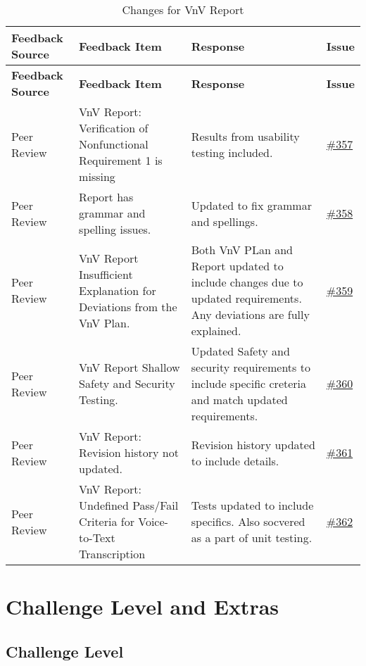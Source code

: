 \documentclass{article}
\begin{document}
\begin{longtable}{| p{} | p{} | p{} | p{} |}
    \caption{Changes for VnV Report} \\
    \hline
    \textbf{Feedback Source} & \textbf{Feedback Item} & \textbf{Response} & \textbf{Issue} \\
    \hline
    \endfirsthead
    \hline
    \textbf{Feedback Source} & \textbf{Feedback Item} & \textbf{Response} & \textbf{Issue} \\
    \hline
    \endhead
    \hline
    \endfoot
    Peer Review & VnV Report: Verification of Nonfunctional Requirement 1 is missing & Results from usability testing included. & \href{https://github.com/PKALXI/RapidCare/issues/357}{\#357} \\
    \hline
    Peer Review & Report has grammar and spelling issues. & Updated to fix grammar and spellings. & \href{https://github.com/PKALXI/RapidCare/issues/358}{\#358} \\
    \hline
    Peer Review & VnV Report Insufficient Explanation for Deviations from the VnV Plan.  & Both VnV PLan and Report updated to include changes due to updated requirements. Any deviations are fully explained. & \href{https://github.com/PKALXI/RapidCare/issues/359}{\#359} \\
    \hline
    Peer Review & VnV Report Shallow Safety and Security Testing. & Updated Safety and security requirements to include specific creteria and match updated requirements. & \href{https://github.com/PKALXI/RapidCare/issues/360}{\#360} \\
    \hline
    Peer Review & VnV Report: Revision history not updated. & Revision history updated to include details. & \href{https://github.com/PKALXI/RapidCare/issues/361}{\#361} \\
    \hline
    Peer Review & VnV Report: Undefined Pass/Fail Criteria for Voice-to-Text Transcription & Tests updated to include specifics. Also socvered as a part of unit testing. & \href{https://github.com/PKALXI/RapidCare/issues/362}{\#362} \\
    \hline
\end{longtable}

\section{Challenge Level and Extras}

\subsection{Challenge Level}
\end{document}
